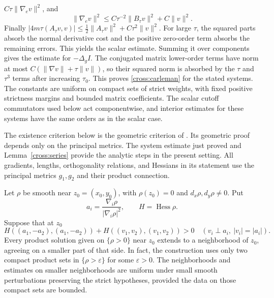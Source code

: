 $C\tau\|\nabla_e v\|^2$, and
\[
 \|\nabla_e v\|^2
 \le C\tau^{-2}\|B_\tau v\|^2+C\|v\|^2.
\]
Finally
$|4m\tau(A_\tau v,v)|\le\tfrac12\|A_\tau v\|^2+
C\tau^2\|v\|^2$.
For large $\tau$, the squared parts absorb the normal derivative
cost and the positive zero-order term absorbs the remaining errors.
This yields the scalar estimate.  Summing it over components gives the
estimate for $-\Delta_gI$.  The conjugated matrix lower-order terms have
norm at most $C(\|\nabla v\|+\tau\|v\|)$, so their squared norm is
absorbed by the $\tau$ and $\tau^3$ terms after increasing $\tau_0$.
This proves \eqref{cross:carleman} for the stated systems.  The constants
are uniform on compact sets of strict weights, with fixed positive
strictness margins and bounded matrix coefficients.  The scalar cutoff
commutators used below act componentwise, and interior estimates for
these systems have the same orders as in the scalar case.

The existence criterion below is the geometric criterion of
\cite[Section~3, ``A geometric criterion for local extension'']{ScalarCompanion2026}.
Its geometric proof depends only on the principal metrics.  The system
estimate just proved and Lemma~\ref{cross:series} provide the analytic
steps in the present setting.  All gradients, lengths, orthogonality
relations, and Hessians in its statement use the principal metrics
$g_1,g_2$ and their product connection.

\begin{proposition}\label{cross:criterion}
Let $\rho$ be smooth near $z_0=(x_0,y_0)$, with $\rho(z_0)=0$ and
$d_x\rho,d_y\rho\ne0$.  Put
\[
 a_i=\frac{\nabla_i\rho}{|\nabla_i\rho|^2},\qquad H=\operatorname{Hess}\rho.
\]
Suppose that at $z_0$
\begin{equation}\label{cross:hessian-test}
 H((a_1,-a_2),(a_1,-a_2))
 +H((v_1,v_2),(v_1,v_2))>0
 \quad
 \left(v_i\perp a_i,\ |v_i|=|a_i|\right).
\end{equation}
Every product solution given on $\{\rho>0\}$ near $z_0$ extends to
a neighborhood of $z_0$, agreeing on a smaller part of that side.
In fact, the construction uses only two compact product sets in
$\{\rho>\varepsilon\}$ for some $\varepsilon>0$.
The neighborhoods and estimates on smaller neighborhoods are uniform
under small smooth perturbations preserving the strict hypotheses,
provided the data on those compact sets are bounded.
\end{proposition}

